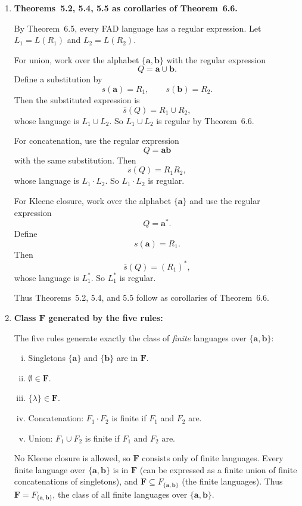 \begin{enumerate}[{6.}1.]
\item \textbf{Theorems~5.2, 5.4, 5.5 as corollaries of Theorem~6.6.}

By Theorem~6.5, every FAD language has a regular expression.  Let
$L_1=L(R_1)$ and $L_2=L(R_2)$.

For union, work over the alphabet $\{\pmb{a},\pmb{b}\}$ with the regular
expression
\[
Q=\pmb{a}\cup\pmb{b}.
\]
Define a substitution by
\[
s(\pmb{a})=R_1,\qquad s(\pmb{b})=R_2.
\]
Then the substituted expression is
\[
\overline{s}(Q)=R_1\cup R_2,
\]
whose language is $L_1\cup L_2$.  So $L_1\cup L_2$ is regular by Theorem~6.6.

For concatenation, use the regular expression
\[
Q=\pmb{ab}
\]
with the same substitution.  Then
\[
\overline{s}(Q)=R_1R_2,
\]
whose language is $L_1\cdot L_2$.  So $L_1\cdot L_2$ is regular.

For Kleene closure, work over the alphabet $\{\pmb{a}\}$ and use the regular
expression
\[
Q=\pmb{a}^*.
\]
Define
\[
s(\pmb{a})=R_1.
\]
Then
\[
\overline{s}(Q)=(R_1)^*,
\]
whose language is $L_1^*$.  So $L_1^*$ is regular.

Thus Theorems~5.2, 5.4, and 5.5 follow as corollaries of Theorem~6.6.

\item \textbf{Class $\pmb{F}$ generated by the five rules:}

The five rules generate exactly the class of \emph{finite} languages over $\{\pmb{a},\pmb{b}\}$:
\begin{enumerate}[(i)]
  \item Singletons $\{\pmb{a}\}$ and $\{\pmb{b}\}$ are in $\pmb{F}$.
  \item $\emptyset\in\pmb{F}$.
  \item $\{\lambda\}\in\pmb{F}$.
  \item Concatenation: $F_1\cdot F_2$ is finite if $F_1$ and $F_2$ are.
  \item Union: $F_1\cup F_2$ is finite if $F_1$ and $F_2$ are.
\end{enumerate}
No Kleene closure is allowed, so $\pmb{F}$ consists only of finite languages.  Every finite language over $\{\pmb{a},\pmb{b}\}$ is in $\pmb{F}$ (can be expressed as a finite union of finite concatenations of singletons), and $\pmb{F}\subseteq F_{\{\pmb{a},\pmb{b}\}}$ (the finite languages).  Thus $\pmb{F}=F_{\{\pmb{a},\pmb{b}\}}$, the class of all finite languages over $\{\pmb{a},\pmb{b}\}$.

\end{enumerate}
